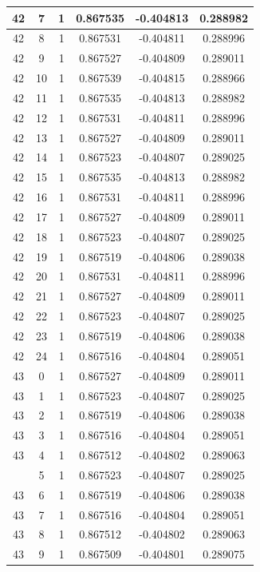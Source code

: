 \documentclass[12pt,a4paper]{article}
\numberwithin{equation}{section}
\numberwithin{figure}{section}
\numberwithin{table}{section}
\begin{document}
\begin{longtable}{|c|c|c|c|c|c|}
42 & 7 & 1 & 0.867535 & -0.404813 & 0.288982 \\ \hline
42 & 8 & 1 & 0.867531 & -0.404811 & 0.288996 \\ \hline
42 & 9 & 1 & 0.867527 & -0.404809 & 0.289011 \\ \hline
42 & 10 & 1 & 0.867539 & -0.404815 & 0.288966 \\ \hline
42 & 11 & 1 & 0.867535 & -0.404813 & 0.288982 \\ \hline
42 & 12 & 1 & 0.867531 & -0.404811 & 0.288996 \\ \hline
42 & 13 & 1 & 0.867527 & -0.404809 & 0.289011 \\ \hline
42 & 14 & 1 & 0.867523 & -0.404807 & 0.289025 \\ \hline
42 & 15 & 1 & 0.867535 & -0.404813 & 0.288982 \\ \hline
42 & 16 & 1 & 0.867531 & -0.404811 & 0.288996 \\ \hline
42 & 17 & 1 & 0.867527 & -0.404809 & 0.289011 \\ \hline
42 & 18 & 1 & 0.867523 & -0.404807 & 0.289025 \\ \hline
42 & 19 & 1 & 0.867519 & -0.404806 & 0.289038 \\ \hline
42 & 20 & 1 & 0.867531 & -0.404811 & 0.288996 \\ \hline
42 & 21 & 1 & 0.867527 & -0.404809 & 0.289011 \\ \hline
42 & 22 & 1 & 0.867523 & -0.404807 & 0.289025 \\ \hline
42 & 23 & 1 & 0.867519 & -0.404806 & 0.289038 \\ \hline
42 & 24 & 1 & 0.867516 & -0.404804 & 0.289051 \\ \hline
43 & 0 & 1 & 0.867527 & -0.404809 & 0.289011 \\ \hline
43 & 1 & 1 & 0.867523 & -0.404807 & 0.289025 \\ \hline
43 & 2 & 1 & 0.867519 & -0.404806 & 0.289038 \\ \hline
43 & 3 & 1 & 0.867516 & -0.404804 & 0.289051 \\ \hline
43 & 4 & 1 & 0.867512 & -0.404802 & 0.289063 \\ \hline
\pagebreak
43 & 5 & 1 & 0.867523 & -0.404807 & 0.289025 \\ \hline
43 & 6 & 1 & 0.867519 & -0.404806 & 0.289038 \\ \hline
43 & 7 & 1 & 0.867516 & -0.404804 & 0.289051 \\ \hline
43 & 8 & 1 & 0.867512 & -0.404802 & 0.289063 \\ \hline
43 & 9 & 1 & 0.867509 & -0.404801 & 0.289075 \\ \hline

\end{longtable}
\end{document}
